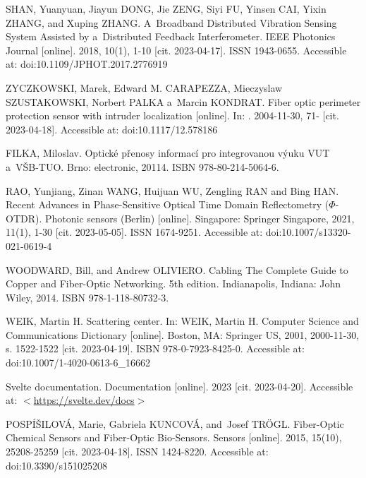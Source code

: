 

\begin{thebibliography}{99}


SHAN, Yuanyuan, Jiayun DONG, Jie ZENG, Siyi FU, Yinsen CAI, Yixin ZHANG, and Xuping ZHANG. A~Broadband Distributed Vibration Sensing System Assisted by a~Distributed Feedback Interferometer. IEEE Photonics Journal [online]. 2018, 10(1), 1-10 [cit. 2023-04-17]. ISSN 1943-0655. Accessible at: doi:10.1109/JPHOT.2017.2776919

ZYCZKOWSKI, Marek, Edward M. CARAPEZZA, Mieczyslaw SZUSTAKOWSKI, Norbert PALKA a~Marcin KONDRAT. Fiber optic perimeter protection sensor with intruder localization [online]. In: . 2004-11-30, 71- [cit. 2023-04-18]. Accessible at: doi:10.1117/12.578186

FILKA, Miloslav. Optické přenosy informací pro integrovanou výuku VUT a~VŠB-TUO. Brno: electronic, 20114. ISBN 978-80-214-5064-6.

RAO, Yunjiang, Zinan WANG, Huijuan WU, Zengling RAN and Bing HAN. Recent Advances in Phase-Sensitive Optical Time Domain Reflectometry ($\Phi$-OTDR). Photonic sensors (Berlin) [online]. Singapore: Springer Singapore, 2021, 11(1), 1-30 [cit. 2023-05-05]. ISSN 1674-9251. Accessible at: doi:10.1007/s13320-021-0619-4


WOODWARD, Bill, and Andrew OLIVIERO. Cabling The Complete Guide to Copper and Fiber-Optic Networking. 5th edition. Indianapolis, Indiana: John Wiley, 2014. ISBN 978-1-118-80732-3.

WEIK, Martin H. Scattering center. In: WEIK, Martin H. Computer Science and Communications Dictionary [online]. Boston, MA: Springer US, 2001, 2000-11-30, s. 1522-1522 [cit. 2023-04-19]. ISBN 978-0-7923-8425-0. Accessible at: doi:10.1007/1-4020-0613-6\_16662

Svelte documentation. Documentation [online]. 2023 [cit. 2023-04-20]. Accessible at: \(<\)\url{https://svelte.dev/docs}\(>\)

POSPÍŠILOVÁ, Marie, Gabriela KUNCOVÁ, and~Josef TRÖGL. Fiber-Optic Chemical Sensors and Fiber-Optic Bio-Sensors. Sensors [online]. 2015, 15(10), 25208-25259 [cit. 2023-04-18]. ISSN 1424-8220. Accessible at: doi:10.3390/s151025208


\end{thebibliography}
